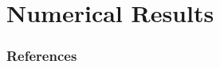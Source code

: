 \documentclass{beamer}
\begin{document}

\section{Numerical Results \cite{morel1985synthetic}}




\begin{frame}[allowframebreaks]
    \frametitle{References}
    
    
\end{frame}
\end{document}

